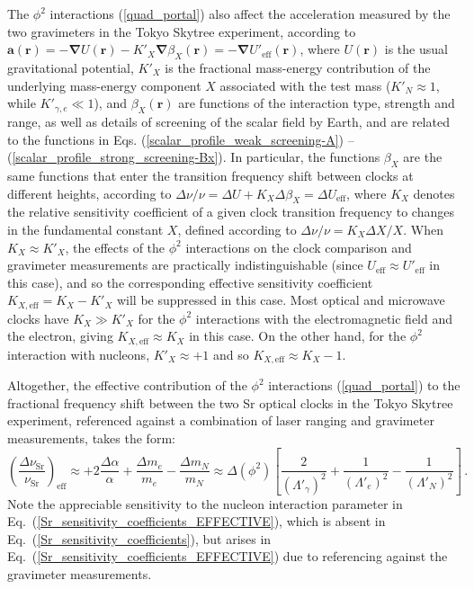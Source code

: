 \documentclass[aps,prd,onecolumn,nofootinbib]{revtex4-2} %
\renewcommand{\v}[1]{\boldsymbol{#1}}		%
\begin{document}
The $\phi^2$ interactions (\ref{quad_portal}) also affect the acceleration measured by the two gravimeters in the Tokyo Skytree experiment, according to $\v{a} (\v{r}) = -\v{\nabla} U (\v{r}) - K'_X \v{\nabla} \beta_X (\v{r})  = -\v{\nabla} U'_\textrm{eff} (\v{r})$, where $U (\v{r})$ is the usual gravitational potential, $K'_X$ is the fractional mass-energy contribution of the underlying mass-energy component $X$ associated with the test mass ($K'_N \approx 1$, while $K'_{\gamma,e} \ll 1$), and $\beta_X (\v{r})$ are functions of the interaction type, strength and range, as well as details of screening of the scalar field by Earth, and are related to the functions in Eqs. (\ref{scalar_profile_weak_screening-A}) -- (\ref{scalar_profile_strong_screening-Bx}). 
In particular, the functions $\beta_X$ are the same functions that enter the transition frequency shift between clocks at different heights, according to $\Delta \nu / \nu = \Delta U + K_X \Delta \beta_X = \Delta U_\textrm{eff}$, where $K_X$ denotes the relative sensitivity coefficient of a given clock transition frequency to changes in the fundamental constant $X$, defined according to $\Delta \nu / \nu = K_X \Delta X / X$. 
When $K_X \approx K'_X$, the effects of the $\phi^2$ interactions on the clock comparison and gravimeter measurements are practically indistinguishable (since $U_\textrm{eff} \approx U'_\textrm{eff}$ in this case), and so the corresponding effective sensitivity coefficient $K_{X,\textrm{eff}} = K_X - K'_X$ will be suppressed in this case. 
Most optical and microwave clocks have $K_X \gg K'_X$ for the $\phi^2$ interactions with the electromagnetic field and the electron, giving $K_{X,\textrm{eff}} \approx K_X$ in this case. 
On the other hand, for the $\phi^2$ interaction with nucleons, $K'_X \approx +1$ and so $K_{X,\textrm{eff}} \approx K_X - 1$. 

Altogether, the effective contribution of the $\phi^2$ interactions (\ref{quad_portal}) to the fractional frequency shift between the two Sr optical clocks in the Tokyo Skytree experiment, referenced against a combination of laser ranging and gravimeter measurements, takes the form: 
\begin{equation}
\label{Sr_sensitivity_coefficients_EFFECTIVE}
\left( \frac{\Delta \nu_\textrm{Sr}}{\nu_\textrm{Sr}} \right)_\textrm{eff} \approx +2 \frac{\Delta \alpha}{\alpha} + \frac{\Delta m_e}{m_e} - \frac{\Delta m_N}{m_N} \approx \Delta(\phi^2) \left[ \frac{2}{\left( \Lambda'_\gamma \right)^2} + \frac{1}{\left( \Lambda'_e \right)^2} - \frac{1}{\left( \Lambda'_N \right)^2} \right]  \, . 
\end{equation}
Note the appreciable sensitivity to the nucleon interaction parameter in Eq.~(\ref{Sr_sensitivity_coefficients_EFFECTIVE}), which is absent in Eq.~(\ref{Sr_sensitivity_coefficients}), but arises in Eq.~(\ref{Sr_sensitivity_coefficients_EFFECTIVE}) due to referencing against the gravimeter measurements. 
\end{document}
